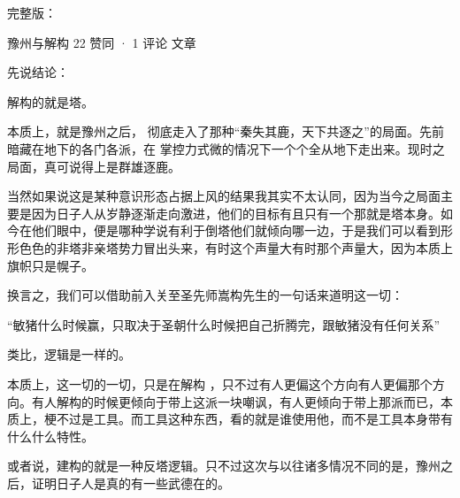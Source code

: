 \begin{zhihuanswer}
完整版：

豫州与解构 22 赞同 · 1 评论 文章

先说结论：

解构的就是塔。

本质上，就是豫州之后，
彻底走入了那种``秦失其鹿，天下共逐之''的局面。先前暗藏在地下的各门各派，在
掌控力式微的情况下一个个全从地下走出来。现时之局面，真可说得上是群雄逐鹿。

当然如果说这是某种意识形态占据上风的结果我其实不太认同，因为当今之局面主要是因为日子人从岁静逐渐走向激进，他们的目标有且只有一个那就是塔本身。如今在他们眼中，便是哪种学说有利于倒塔他们就倾向哪一边，于是我们可以看到形形色色的非塔非亲塔势力冒出头来，有时这个声量大有时那个声量大，因为本质上旗帜只是幌子。

换言之，我们可以借助前入关至圣先师嵩构先生的一句话来道明这一切：

``敏猪什么时候赢，只取决于圣朝什么时候把自己折腾完，跟敏猪没有任何关系''

类比，逻辑是一样的。

本质上，这一切的一切，只是在解构
，只不过有人更偏这个方向有人更偏那个方向。有人解构的时候更倾向于带上这派一块嘲讽，有人更倾向于带上那派而已，本质上，梗不过是工具。而工具这种东西，看的就是谁使用他，而不是工具本身带有什么什么特性。

或者说，建构的就是一种反塔逻辑。只不过这次与以往诸多情况不同的是，豫州之后，证明日子人是真的有一些武德在的。
\end{zhihuanswer}
